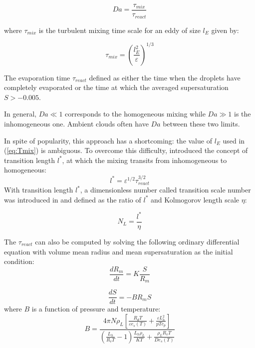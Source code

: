 \documentclass[draft,jgrga]{AGUTeX}
\begin{document}
\begin{article}
\begin{equation}
Da=\frac{\tau_{mix}}{\tau_{react}}\label{eq:DaNumber}
\end{equation}


where $\tau_{mix}$ is the turbulent mixing time scale for an eddy of size $l_E$ given by:

\begin{equation}
\tau_{mix}=(\frac{l_E^{2}}{\varepsilon})^{1/3}\label{eq:Tmix}
\end{equation}

The evaporation time $\tau_{react}$ defined as either the time when the droplets have completely evaporated or the time at which the averaged supersaturation $S > -0.005$.

In general, $Da\ll1$ corresponds to the homogeneous mixing while $Da\gg1$ is the inhomogeneous one. Ambient clouds often have $Da$ between these two limits.

In spite of popularity, this approach has a shortcoming:
the value of $l_E$ used in (\ref{eq:Tmix}) is ambiguous. To overcome this difficulty, \cite{Lehmann09} introduced the concept of transition length $l^{*}$, at which the mixing transits from inhomogeneous to homogeneous:
\begin{equation}
l^{*}=\varepsilon^{1/2}\tau_{react}^{3/2}\label{eq:TransL}
\end{equation}
With transition length $l^{*}$, a dimensionless number called transition scale number was introduced in \cite{Chunsong13} and defined as the ratio of $l^{*}$ and Kolmogorov length scale $\eta$:

\begin{equation}
N_{L}=\frac{l^{*}}{\eta}\label{eq:NL}
\end{equation}

The $\tau_{react}$ can also be computed by solving the following ordinary differential equation with volume mean radius and mean supersaturation as the initial condition:
\begin{equation}
\frac{dR_{m}}{dt}=K\frac{S}{R_{m}}\label{eq:DiffR}
\end{equation}

\begin{equation}
\frac{dS}{dt}=-BR_{m}S\label{eq:DiffSuper}
\end{equation}
where $B$ is a function of pressure and temperature:
\begin{equation}
B = 
\frac{4\pi N\rho_L[\frac{R_dT}{\varepsilon e_s(T)} + \frac{\varepsilon L^2_h}{pTc_p}]} 
{(\frac{L_h}{R_vT}-1)\frac{L_h\rho_L}{KT} + \frac{\rho_L R_v T}{De_s(T)}}
\end{equation}


\end{article}
\end{document}
